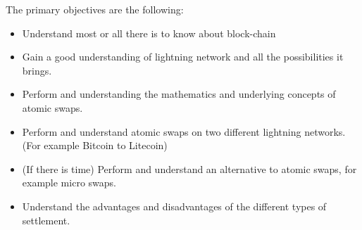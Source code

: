 The primary objectives are the following: 

\begin{itemize}
	\item Understand most or all there is to know about block-chain
	\item Gain a good understanding of lightning network and all the possibilities it brings. 
	\item Perform and understanding the mathematics and underlying concepts of atomic swaps.
	\item Perform and understand atomic swaps on two different lightning networks. (For example Bitcoin to Litecoin)
	\item (If there is time) Perform and understand an alternative to atomic swaps, for example micro swaps.
	\item Understand the advantages and disadvantages of the different types of settlement.
\end{itemize}